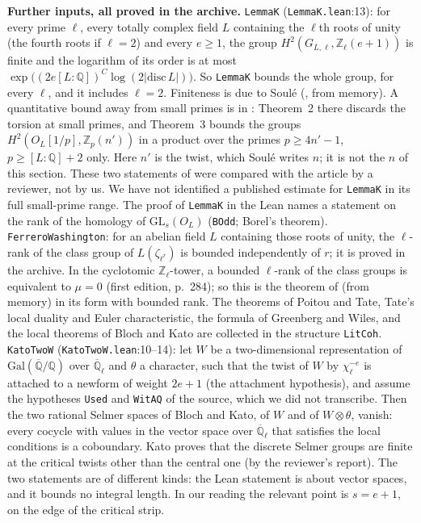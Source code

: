 \documentclass[11pt,letterpaper]{article}
\newcommand{\Z}{\mathbb Z}\newcommand{\Q}{\mathbb Q}\newcommand{\C}{\mathbb C}
\begin{document}
\textbf{Further inputs, all proved in the archive.} \texttt{LemmaK} (\texttt{LemmaK.lean}:13): for
every prime $\ell$, every totally complex field $L$
containing the $\ell$th roots of unity (the fourth roots if $\ell=2$) and every $e\ge1$, the group
$H^2(G_{L,\ell},\Z_\ell(e+1))$ is finite and the logarithm of its order is at most
$\exp\big((2e[L:\Q])^{C}\log(2|\mathrm{disc}\,L|)\big)$. So \texttt{LemmaK} bounds the whole group, for
every $\ell$, and it includes $\ell=2$. Finiteness is due to Soul\'e (\cite{Sou79}, from memory). A
quantitative bound away from small primes is in \cite{Sou03}: Theorem~2 there discards the torsion at small
primes, and Theorem~3 bounds the groups $H^2(O_L[1/p],\Z_p(n'))$ in a product over the primes $p\ge4n'-1$,
$p\ge[L:\Q]+2$ only. Here $n'$ is the twist, which Soul\'e writes $n$; it is not the $n$ of this section.
These two statements of \cite{Sou03} were compared with the article by a reviewer, not by us. We have not
identified a published estimate for \texttt{LemmaK} in its full small-prime range. The proof of
\texttt{LemmaK} in the Lean names a statement on the rank of the homology
of $\mathrm{GL}_s(O_L)$ (\texttt{BOdd}; Borel's theorem). \texttt{FerreroWashington}: for an abelian field
$L$ containing those roots of unity, the $\ell$-rank of the class group of $L(\zeta_{\ell^{r}})$ is bounded
independently of $r$; it is proved in the archive. In the cyclotomic $\Z_\ell$-tower, a bounded $\ell$-rank of
the class groups is equivalent to $\mu=0$ \cite[Prop.~13.23]{Was82} (first edition, p.~284); so this is the
theorem of \cite{FW79} (from memory) in its form with bounded rank. The theorems of Poitou and Tate, Tate's local duality and
Euler characteristic, the formula of Greenberg and Wiles, and the local theorems of Bloch and Kato
are collected in the structure \texttt{LitCoh}. \texttt{KatoTwoW} (\texttt{KatoTwoW.lean}:10--14): let $W$ be
a two-dimensional representation of $\mathrm{Gal}(\overline{\Q}/\Q)$ over $\overline{\Q}_\ell$ and $\theta$ a
character, such that the twist of $W$ by $\chi_\ell^{-e}$ is attached to a newform of weight $2e+1$
(the attachment hypothesis), and assume the hypotheses \texttt{Used} and \texttt{WitAQ} of the source, which
we did not transcribe. Then the two rational Selmer spaces of Bloch and Kato, of $W$ and of
$W\otimes\theta$, vanish: every cocycle with values in the vector space over $\overline{\Q}_\ell$ that
satisfies the local conditions is a coboundary. Kato \cite[\S14.1 and Thm.~14.2(1)]{Kat04} proves that the
discrete Selmer groups are finite at the critical twists other than the central one (by the reviewer's
report). The two statements are
of different kinds: the Lean statement is about vector spaces, and it bounds no integral length. In our
reading the relevant point is $s=e+1$, on the edge of the critical strip.
\end{document}
